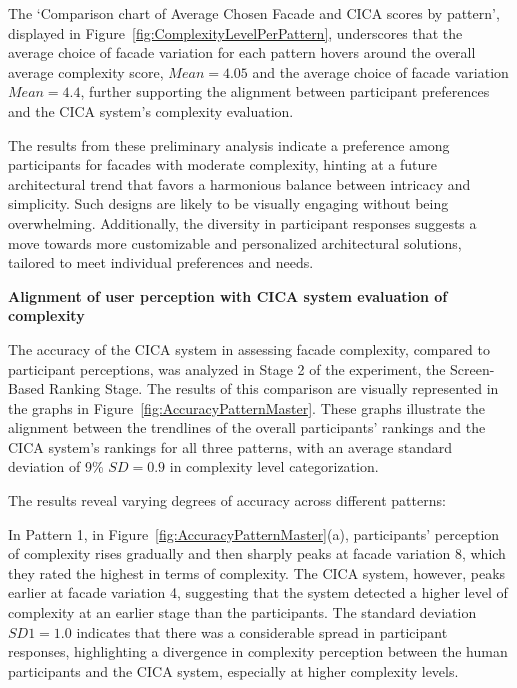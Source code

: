 
The `Comparison chart of Average Chosen Facade and CICA scores by pattern', displayed in Figure~\ref{fig:ComplexityLevelPerPattern}, underscores that the average choice of facade variation for each pattern hovers around the overall average complexity score, \(Mean = 4.05\) and the average choice of facade variation \(Mean = 4.4\), further supporting the alignment between participant preferences and the CICA system's complexity evaluation.


The results from these preliminary analysis indicate a preference among participants for facades with moderate complexity, hinting at a future architectural trend that favors a harmonious balance between intricacy and simplicity.
Such designs are likely to be visually engaging without being overwhelming.
Additionally, the diversity in participant responses suggests a move towards more customizable and personalized architectural solutions, tailored to meet individual preferences and needs.

\textbf{Alignment of user perception with CICA system evaluation of complexity}

The accuracy of the CICA system in assessing facade complexity, compared to participant perceptions, was analyzed in Stage 2 of the experiment, the Screen-Based Ranking Stage.
The results of this comparison are visually represented in the graphs in Figure~\ref{fig:AccuracyPatternMaster}.
These graphs illustrate the alignment between the trendlines of the overall participants' rankings and the CICA system's rankings for all three patterns, with an average standard deviation of 9\% \(SD = 0.9\) in complexity level categorization.

The results reveal varying degrees of accuracy across different patterns:

In Pattern 1, in Figure~\ref{fig:AccuracyPatternMaster}(a), participants' perception of complexity rises gradually and then sharply peaks at facade variation 8, which they rated the highest in terms of complexity.
The CICA system, however, peaks earlier at facade variation 4, suggesting that the system detected a higher level of complexity at an earlier stage than the participants.
The standard deviation \(SD1 = 1.0\) indicates that there was a considerable spread in participant responses, highlighting a divergence in complexity perception between the human participants and the CICA system, especially at higher complexity levels.

